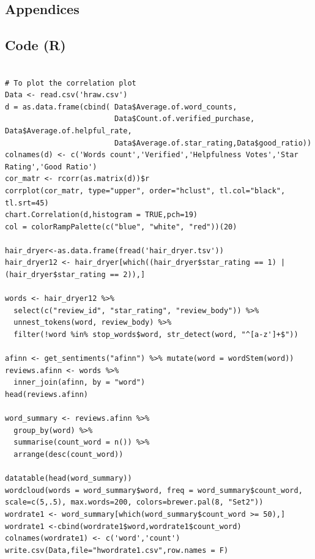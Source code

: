 \documentclass[12pt]{article}
\begin{document}
\begin{appendices}
\section{Appendices}
\subsection{Code (R)}

\begin{lstlisting}

# To plot the correlation plot
Data <- read.csv('hraw.csv')
d = as.data.frame(cbind( Data$Average.of.word_counts,
                         Data$Count.of.verified_purchase, Data$Average.of.helpful_rate, 
                         Data$Average.of.star_rating,Data$good_ratio))
colnames(d) <- c('Words count','Verified','Helpfulness Votes','Star Rating','Good Ratio')
cor_matr <- rcorr(as.matrix(d))$r
corrplot(cor_matr, type="upper", order="hclust", tl.col="black", tl.srt=45)
chart.Correlation(d,histogram = TRUE,pch=19)
col = colorRampPalette(c("blue", "white", "red"))(20)

hair_dryer<-as.data.frame(fread('hair_dryer.tsv'))
hair_dryer12 <- hair_dryer[which((hair_dryer$star_rating == 1) | (hair_dryer$star_rating == 2)),]

words <- hair_dryer12 %>%
  select(c("review_id", "star_rating", "review_body")) %>%
  unnest_tokens(word, review_body) %>%
  filter(!word %in% stop_words$word, str_detect(word, "^[a-z']+$"))

afinn <- get_sentiments("afinn") %>% mutate(word = wordStem(word))
reviews.afinn <- words %>%
  inner_join(afinn, by = "word")
head(reviews.afinn)

word_summary <- reviews.afinn %>%
  group_by(word) %>%
  summarise(count_word = n()) %>%
  arrange(desc(count_word))

datatable(head(word_summary))
wordcloud(words = word_summary$word, freq = word_summary$count_word, scale=c(5,.5), max.words=200, colors=brewer.pal(8, "Set2"))
wordrate1 <- word_summary[which(word_summary$count_word >= 50),]
wordrate1 <-cbind(wordrate1$word,wordrate1$count_word)
colnames(wordrate1) <- c('word','count')
write.csv(Data,file="hwordrate1.csv",row.names = F)


\end{lstlisting}
\end{appendices}
\end{document}
